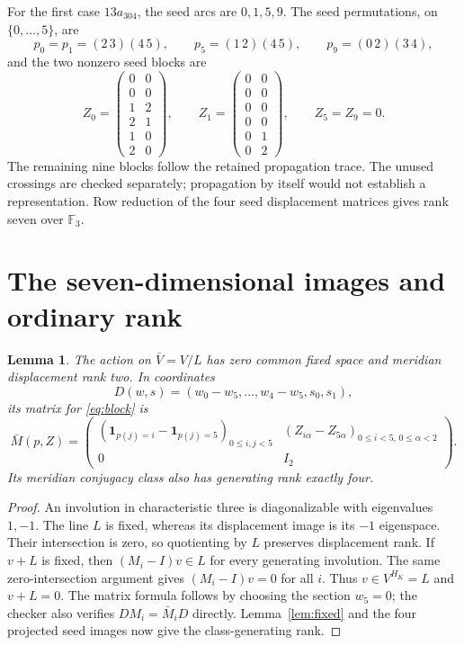 \documentclass[11pt]{article}
\newtheorem{lemma}{Lemma}
\newcommand{\F}{\mathbb F}
\begin{document}
For the first case $13a_{304}$, the seed arcs are $0,1,5,9$.
The seed permutations, on $\{0,\ldots,5\}$, are
\[
 p_0=p_1=(2\,3)(4\,5),\qquad
 p_5=(1\,2)(4\,5),\qquad p_9=(0\,2)(3\,4),
\]
and the two nonzero seed blocks are
\[
 Z_0=\begin{pmatrix}0&0\\0&0\\1&2\\2&1\\1&0\\2&0\end{pmatrix},
 \qquad
 Z_1=\begin{pmatrix}0&0\\0&0\\0&0\\0&0\\0&1\\0&2\end{pmatrix},
 \qquad Z_5=Z_9=0.
\]
The remaining nine blocks follow the retained propagation trace.
The unused crossings are checked separately; propagation by itself
would not establish a representation. Row reduction of the four
seed displacement matrices gives rank seven over $\F_3$.

\section{The seven-dimensional images and ordinary rank}

\begin{lemma}\label{lem:quotient}
The action on $\bar V=V/L$ has zero common fixed space and meridian
displacement rank two. In coordinates
\[
 D(w,s)=(w_0-w_5,\ldots,w_4-w_5,s_0,s_1),
\]
its matrix for \eqref{eq:block} is
\[
 \bar M(p,Z)=
 \begin{pmatrix}
  (\mathbf1_{p(j)=i}-\mathbf1_{p(j)=5})_{0\le i,j<5}
    &(Z_{i\alpha}-Z_{5\alpha})_{0\le i<5,\,0\le\alpha<2}\\
 0&I_2
 \end{pmatrix}.
\]
Its meridian conjugacy class also has generating rank exactly four.
\end{lemma}
\begin{proof}
An involution in characteristic three is diagonalizable with
eigenvalues $1,-1$. The line $L$ is fixed, whereas its displacement
image is its $-1$ eigenspace. Their intersection is zero, so
quotienting by $L$ preserves displacement rank.
If $v+L$ is fixed, then $(M_i-I)v\in L$ for every generating
involution. The same zero-intersection argument gives
$(M_i-I)v=0$ for all $i$. Thus $v\in V^{H_K}=L$ and $v+L=0$.
The matrix formula follows by choosing the section $w_5=0$;
the checker also verifies $DM_i=\bar M_iD$ directly.
Lemma~\ref{lem:fixed} and the four projected seed images now give
the class-generating rank.
\end{proof}
\end{document}
